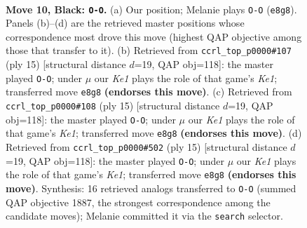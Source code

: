 \documentclass[11pt]{article}
\begin{document}
\clearpage

\begin{figure}[p]\centering
\begin{subfigure}{0.46\textwidth}\centering
\resizebox{\linewidth}{!}{%
\newchessgame
\chessboard[
  setfen={rnbqk2r/1p2bppp/p2p1n2/4p3/P3P3/1PN2N2/2P1BPPP/R1BQ1RK1 b kq - 0 10},
  showmover=false,
  pgfstyle=straightmove, color=movearrow, markmove={e8-g8}
]}
\caption{}
\end{subfigure}\hfill
\begin{subfigure}{0.46\textwidth}\centering
\resizebox{\linewidth}{!}{%
\newchessgame
\chessboard[
  setfen={rnbqk2r/1p2bppp/p2p1n2/4p3/4P3/1NN5/PPP1BPPP/R1BQ1RK1 b kq - 3 8},
  showmover=false,
  pgfstyle=straightmove, color=movearrow, markmove={e8-g8}
]}
\caption{}
\end{subfigure}
\\[4pt]
\begin{subfigure}{0.46\textwidth}\centering
\resizebox{\linewidth}{!}{%
\newchessgame
\chessboard[
  setfen={rnbqk2r/1p2bppp/p2p1n2/4p3/4P3/1NN5/PPP1BPPP/R1BQ1RK1 b kq - 3 8},
  showmover=false,
  pgfstyle=straightmove, color=movearrow, markmove={e8-g8}
]}
\caption{}
\end{subfigure}\hfill
\begin{subfigure}{0.46\textwidth}\centering
\resizebox{\linewidth}{!}{%
\newchessgame
\chessboard[
  setfen={rnbqk2r/1p2bppp/p2p1n2/4p3/4P3/1NN5/PPP1BPPP/R1BQ1RK1 b kq - 3 8},
  showmover=false,
  pgfstyle=straightmove, color=movearrow, markmove={e8-g8}
]}
\caption{}
\end{subfigure}
\caption{\textbf{Move 10, Black: \texttt{O-O}.} (a) Our position; Melanie plays \texttt{O-O} (\texttt{e8g8}). Panels (b)--(d) are the retrieved master positions whose correspondence most drove this move (highest QAP objective among those that transfer to it). (b) Retrieved from \texttt{ccrl\_top\_p0000\#107} (ply 15) [structural distance $d$=19, QAP obj=118]: the master played \texttt{O-O}; under $\mu$ our \emph{Ke1} plays the role of that game's \emph{Ke1}; transferred move \texttt{e8g8} \textbf{(endorses this move)}. (c) Retrieved from \texttt{ccrl\_top\_p0000\#108} (ply 15) [structural distance $d$=19, QAP obj=118]: the master played \texttt{O-O}; under $\mu$ our \emph{Ke1} plays the role of that game's \emph{Ke1}; transferred move \texttt{e8g8} \textbf{(endorses this move)}. (d) Retrieved from \texttt{ccrl\_top\_p0000\#502} (ply 15) [structural distance $d$=19, QAP obj=118]: the master played \texttt{O-O}; under $\mu$ our \emph{Ke1} plays the role of that game's \emph{Ke1}; transferred move \texttt{e8g8} \textbf{(endorses this move)}. Synthesis: 16 retrieved analogs transferred to \texttt{O-O} (summed QAP objective 1887, the strongest correspondence among the candidate moves); Melanie committed it via the \texttt{search} selector.}
\label{fig:thought-m19}
\end{figure}
\end{document}
